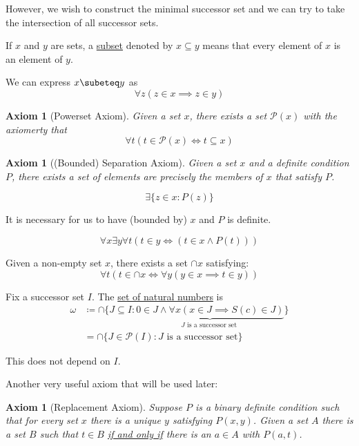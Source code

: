 \documentclass[11pt]{article}
\theoremstyle{theorem}
\newtheorem{axiom}[theorem]{Axiom}
\begin{document}
\begin{titlepage}
However, we wish to construct the minimal successor set and we can try to take
the intersection of all successor sets.
\begin{definition}
	If $x$ and $y$ are sets, a \underline{subset} denoted by $x \subseteq y$
	means that every element of $x$ is an element of $y$.
\end{definition}
We can express $x \subeteq y$ as
\begin{equation*}
	\forall z (z \in x \implies z \in y)
\end{equation*}
\begin{axiom}[Powerset Axiom]
	Given a set $x$, there exists a set $\mathcal{P}(x)$ with the axiomerty that
	\begin{equation*}
		\forall t(t \in \mathcal{P}(x) \iff t \subseteq x)
	\end{equation*}
\end{axiom}
\begin{axiom}[(Bounded) Separation Axiom]
	Given a set $x$ and a definite condition $P$, there exists a set of elements
	are precisely the members of $x$ that satisfy $P$.
\end{axiom}
\begin{equation*}
	\exists \{z\in x : P(z)\}
\end{equation*}
\begin{remark}
	It is necessary for us to have (bounded by) $x$ and $P$ is definite.
\end{remark}
\begin{equation*}
	\forall x \exists y \forall t (t \in y \iff (t \in x \wedge P(t)))
\end{equation*}
\begin{exercise}
	Given a non-empty set $x$, there exists a set $\cap x$ satisfying:
	\begin{equation*}
		\forall t (t \in \cap x \iff \forall y (y \in x \implies t \in y))
	\end{equation*}
\end{exercise}
\begin{definition}
	Fix a successor set $I$. The \underline{set of natural numbers} is
	\begin{align*}
		\omega &\coloneqq \cap\{ J \subseteq I : \underbrace{0 \in J \wedge
		\forall x(x \in J \implies S(c) \in J)}_{J \text{ is a successor set
		}}\}\\
		&= \cap\{ J \in \mathcal{P}(I) : J \text{ is a successor set}\}
	\end{align*}
\end{definition}
\begin{exercise}
	This does not depend on $I$.
\end{exercise}
Another very useful axiom that will be used later:
\begin{axiom}[Replacement Axiom]
	Suppose $P$ is a binary definite condition such that for every set $x$ there
	is a unique $y$ satisfying $P(x,y)$. Given a set $A$ there is a set $B$ such
	that $t \in B$ \underline{if and only if} there is an $a \in A$ with
	$P(a, t)$.
\end{axiom}


\end{titlepage}
\end{document}
